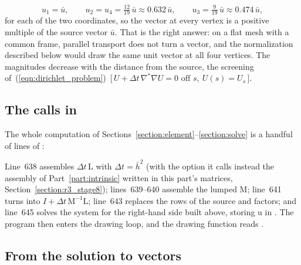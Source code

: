 \begin{equation*}
u_1 = \bar u, \qquad u_2 = u_4 = \tfrac{12}{19}\,\bar u \approx 0.632\,\bar u, \qquad u_3 = \tfrac{9}{19}\,\bar u \approx 0.474\,\bar u ,
\end{equation*}
for each of the two coordinates, so the vector at every vertex is a positive multiple of the source vector $\bar u$. That is the right answer: on a flat mesh with a common frame, parallel transport does not turn a vector, and the normalization described below would draw the same unit vector at all four vertices. The magnitudes decrease with the distance from the source, the screening of~(\ref{eqn:dirichlet_problem})~[\,$U + \Delta t\,\nabla^*\nabla U = 0 \text{ off } s,\ U(s) = U_s$\,].


\subsection{The calls in }

The whole computation of Sections~\ref{section:element}--\ref{section:solve} is a handful of lines of :

Line~638 assembles $\Delta t\,\mathrm L$ with $\Delta t = \bar h^2$ (with the option  it calls instead the assembly of Part~\ref{part:intrinsic} written in this part's matrices, Section~\ref{section:r3_stage8}); lines~639--640 assemble the lumped $\mathrm M$; line~641 turns  into $I + \Delta t\,\mathrm M^{-1}\mathrm L$; line~643 replaces the rows of the source and factors; and line~645 solves the system for the right-hand side built above, storing $\mathrm u$ in . The program then enters the drawing loop, and the drawing function reads .

\subsection{From the solution to vectors}

